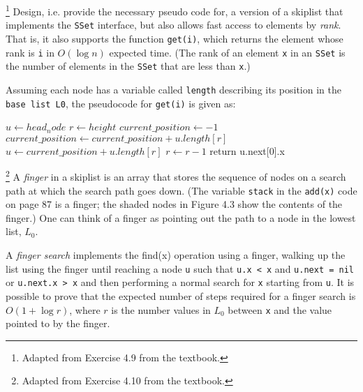 \documentclass[addpoints]{exam}
\begin{document}
\begin{questions}
\footnote{Adapted from Exercise 4.9 from the textbook.}
  Design, i.e. provide the necessary pseudo code for, a version of a skiplist that implements the \texttt{SSet} interface, but also allows fast access to elements by \textit{rank}. That is, it also supports the function \texttt{get(i)}, which returns the element whose rank is \texttt{i} in $O(\log n)$ expected time. (The rank of an element \texttt{x} in an \texttt{SSet} is the number of elements in the \texttt{SSet} that are less than \texttt{x}.)
  \begin{solution}
  Assuming each node has a variable called \texttt{length} describing its position in the \texttt{base list L0}, the pseudocode for \texttt{get(i)} is given as:
    \begin{algorithmic}
    \Statex $u \leftarrow head_node$ 
    \Statex $r \leftarrow height$ 
    \Statex $current\_position \leftarrow -1$ 
    \State $current\_position \leftarrow current\_position + u.length[r]$ 
    \State $u \leftarrow current\_position + u.length[r]$ 
    \EndWhile
    \State $r \leftarrow r - 1$  
    \EndWhile
    \Statex return u.next[0].x
    \end{algorithmic}
  \end{solution}

\footnote{Adapted from Exercise 4.10 from the textbook.}
  A \textit{finger} in a skiplist is an array that stores the sequence of nodes on a search path at which the search path goes down. (The variable \texttt{stack} in the \texttt{add(x)} code on page 87 is a finger; the shaded nodes in Figure 4.3 show the contents of the finger.) One can think of a finger as pointing out the path to a node in the lowest list, $L_0$.
  
  A \textit{finger search} implements the find(x) operation using a finger, walking up the list using the finger until reaching a node \texttt{u} such that \texttt{u.x < x} and \texttt{u.next = nil} or \texttt{u.next.x > x} and then performing a normal search for \texttt{x} starting from \texttt{u}. It is possible to prove that the expected number of steps required for a finger search is $O(1+\log r)$, where $r$ is the number values in $L_0$ between \texttt{x} and the value pointed to by the finger.


\end{questions}
\end{document}
